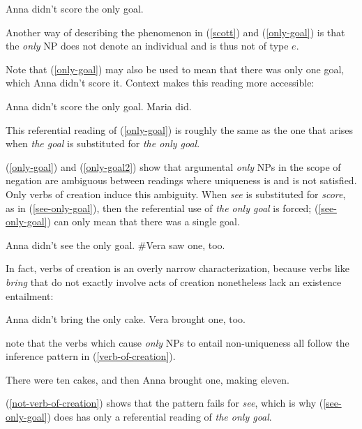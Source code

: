 \begin{exe}
	\ex \label{only-goal} Anna didn't score the only goal.
\end{exe}

Another way of describing the phenomenon in (\ref{scott}) and (\ref{only-goal}) is that the \textit{only} NP does not denote an individual and is thus not of type $e$.

Note that (\ref{only-goal}) may also be used to mean that there was only one goal, which Anna didn't score it. Context makes this reading more accessible:

\begin{exe}
	\ex \label{only-goal2} Anna didn't score the only goal. Maria did.
\end{exe}

This referential reading of (\ref{only-goal}) is roughly the same as the one that arises when \textit{the goal} is substituted for \textit{the only goal}.

(\ref{only-goal}) and (\ref{only-goal2}) show that argumental \textit{only} NPs in the scope of negation are ambiguous between readings where uniqueness is and is not satisfied. Only verbs of creation induce this ambiguity. When \textit{see} is substituted for \textit{score}, as in (\ref{see-only-goal}), then the referential use of \textit{the only goal} is forced; (\ref{see-only-goal}) can only mean that there was a single goal.

\begin{exe}
	\ex \label{see-only-goal} Anna didn't see the only goal. \#Vera saw one, too.
\end{exe}

In fact, verbs of creation is an overly narrow characterization, because verbs like \textit{bring} that do not exactly involve acts of creation nonetheless lack an existence entailment:

\begin{exe}
	\ex Anna didn't bring the only cake. Vera brought one, too.
\end{exe}

\citet{cb2015} note that the verbs which cause \textit{only} NPs to entail non-uniqueness all follow the inference pattern in (\ref{verb-of-creation}).

\begin{exe}
	\ex \label{verb-of-creation} There were ten cakes, and then Anna brought one, making eleven.
\end{exe}
	
(\ref{not-verb-of-creation}) shows that the pattern fails for \textit{see}, which is why (\ref{see-only-goal}) does has only a referential reading of \textit{the only goal}.


